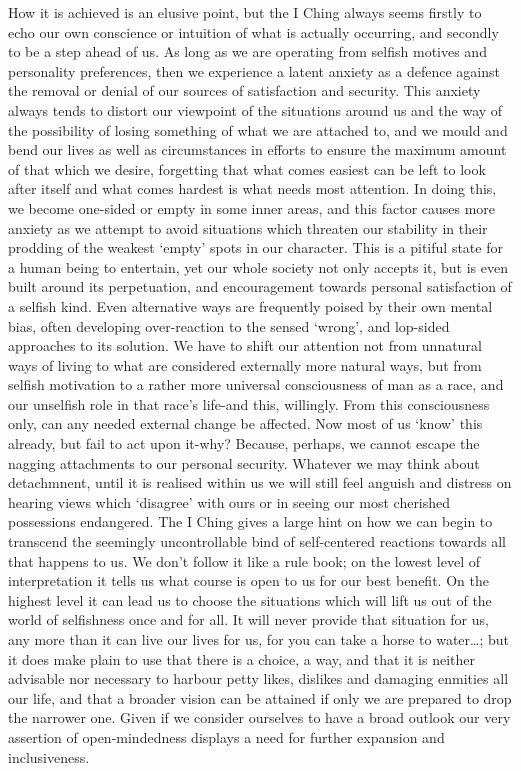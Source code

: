 \documentclass[11pt]{book}
\begin{document}
How it is achieved is an elusive point, but the I Ching always seems firstly to echo our own conscience or intuition of what is actually occurring, and secondly to be a step ahead of us. As long as we are operating from selfish motives and personality preferences, then we experience a latent anxiety as a defence against the removal or denial of our sources of satisfaction and security. This anxiety always tends to distort our viewpoint of the situations around us and the way of the possibility of losing something of what we are attached to, and we mould and bend our lives as well as circumstances in efforts to ensure the maximum amount of that which we desire, forgetting that what comes easiest can be left to look after itself and what comes hardest is what needs most attention. In doing this, we become one-sided or empty in some inner areas, and this factor causes more anxiety as we attempt to avoid situations which threaten our stability in their prodding of the weakest `empty' spots in our character. This is a pitiful state for a human being to entertain, yet our whole society not only accepts it, but is even built around its perpetuation, and encouragement towards personal satisfaction of a selfish kind. Even alternative ways are frequently poised by their own mental bias, often developing over-reaction to the sensed `wrong', and lop-sided approaches to its solution. We have to shift our attention not from unnatural ways of living to what are considered externally more natural ways, but from selfish motivation to a rather more universal consciousness of man as a race, and our unselfish role in that race's life-and this, willingly. From this consciousness only, can any needed external change be affected. Now most of us `know' this already, but fail to act upon it-why? Because, perhaps, we cannot escape the nagging attachments to our personal security. Whatever we may think about detachmnent, until it is realised within us we will still feel anguish and distress on hearing views which `disagree' with ours or in seeing our most cherished possessions endangered. The I Ching gives a large hint on how we can begin to transcend the seemingly uncontrollable bind of self-centered reactions towards all that happens to us. We don't follow it like a rule book; on the lowest level of interpretation it tells us what course is open to us for our best benefit. On the highest level it can lead us to choose the situations which will lift us out of the world of selfishness once and for all. It will never provide that situation for us, any more than it can live our lives for us, for you can take a horse to water\ldots; but it does make plain to use that there is a choice, a way, and that it is neither advisable nor necessary to harbour petty likes, dislikes and damaging enmities all our life, and that a broader vision can be attained if only we are prepared to drop the narrower one. Given if we consider ourselves to have a broad outlook our very assertion of open-mindedness displays a need for further expansion and inclusiveness.
\end{document}
